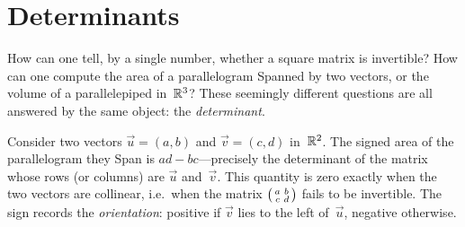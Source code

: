 
\chapter{Determinants}\label{ch:determinants}


How can one tell, by a single number, whether a square matrix is
invertible? How can one compute the area of a parallelogram Spanned by
two vectors, or the volume of a parallelepiped in~${\mathbb{R}}^3$? These
seemingly different questions are all answered by the same object:
the \emph{determinant}.

Consider two vectors $\vec{u}=(a,b)$ and $\vec{v}=(c,d)$ in~${\mathbb{R}}^2$.
The signed area of the parallelogram they Span is
$ad - bc$---precisely the determinant of the matrix whose rows (or
columns) are $\vec{u}$ and~$\vec{v}$. This quantity is zero exactly
when the two vectors are collinear, i.e.\ when the matrix
$\begin{psmallmatrix} a & b \\ c & d \end{psmallmatrix}$ fails to be
invertible. The sign records the \emph{orientation}: positive if
$\vec{v}$ lies to the left of~$\vec{u}$, negative otherwise.

\begin{center}
\label{fig:det-parallelogram-intro}
\end{center}

